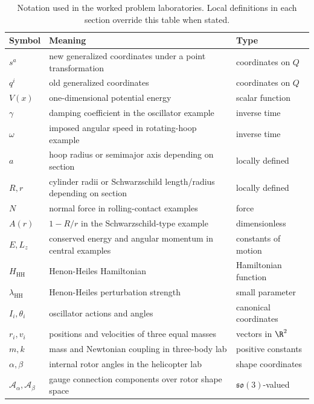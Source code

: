 \begin{table}[htbp]
\centering
\caption{Notation used in the worked problem laboratories. Local definitions in
each section override this table when stated.}
\label{tab:worked-lab-notation}
\small
\begin{tabular}{p{}p{}p{}}
\toprule
Symbol & Meaning & Type\\
\midrule
\(s^a\) & new generalized coordinates under a point transformation & coordinates on \(Q\)\\
\(q^i\) & old generalized coordinates & coordinates on \(Q\)\\
\(V(x)\) & one-dimensional potential energy & scalar function\\
\(\gamma\) & damping coefficient in the oscillator example & inverse time\\
\(\omega\) & imposed angular speed in rotating-hoop example & inverse time\\
\(a\) & hoop radius or semimajor axis depending on section & locally defined\\
\(R,r\) & cylinder radii or Schwarzschild length/radius depending on section & locally defined\\
\(N\) & normal force in rolling-contact examples & force\\
\(A(r)\) & \(1-R/r\) in the Schwarzschild-type example & dimensionless\\
\(E,L_z\) & conserved energy and angular momentum in central examples & constants of motion\\
\(H_{\mathrm{HH}}\) & Henon-Heiles Hamiltonian & Hamiltonian function\\
\(\lambda_{\mathrm{HH}}\) & Henon-Heiles perturbation strength & small parameter\\
\(I_i,\theta_i\) & oscillator actions and angles & canonical coordinates\\
\(r_i,v_i\) & positions and velocities of three equal masses & vectors in \(\R^2\)\\
\(m,k\) & mass and Newtonian coupling in three-body lab & positive constants\\
\(\alpha,\beta\) & internal rotor angles in the helicopter lab & shape coordinates\\
\(\mathcal A_\alpha,\mathcal A_\beta\) & gauge connection components over rotor shape space & \(\mathfrak{so}(3)\)-valued\\
\bottomrule
\end{tabular}
\end{table}

